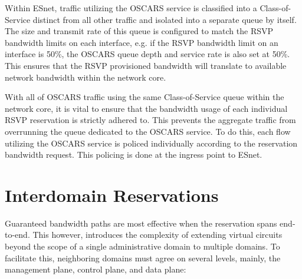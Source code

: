 \documentclass[conference]{IEEEtran}
\begin{document}
Within ESnet, traffic 
utilizing the OSCARS service is classified into a Class-of-Service distinct 
from all other traffic and isolated into a separate queue by itself.  The size 
and transmit rate of this queue is configured to match the RSVP bandwidth 
limits on each interface, e.g. if the RSVP bandwidth limit on an interface is 
50\%, the OSCARS queue depth and service rate is also set at 50\%.  This 
ensures that the RSVP provisioned bandwidth will translate to available 
network bandwidth within the network core.

With all of OSCARS traffic using the same Class-of-Service queue within the 
network core, it is vital to ensure that the bandwidth usage of each 
individual 
RSVP reservation is strictly adhered to.  This prevents the aggregate traffic 
from overrunning the queue dedicated to the OSCARS service.  To do this, each 
flow utilizing the OSCARS service is policed individually according to the 
reservation bandwidth request.  This policing is done at the ingress point to 
ESnet.


\section{Interdomain Reservations}

Guaranteed bandwidth paths are most effective 
when the reservation spans end-to-end.  This however, introduces the 
complexity of extending virtual circuits beyond the scope of a 
single administrative domain to multiple domains.  To facilitate this, 
neighboring domains must agree on several levels, mainly, the management plane, 
control plane, and data plane:
\end{document}
